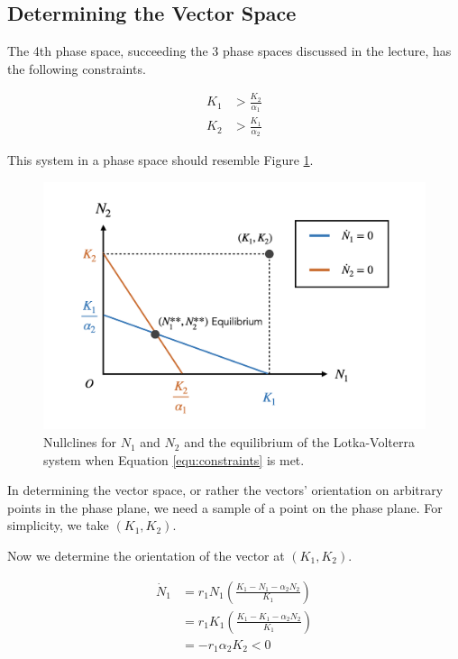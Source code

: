 \subsection{Determining the Vector Space}
The 4th phase space, succeeding the 3 phase spaces discussed in the lecture, has the following constraints.

\begin{equation}
  \label{equ:constraints}
  \begin{aligned}
    K_1 &> \frac {K_2} {\alpha_1} \\
    K_2 &> \frac {K_1} {\alpha_2}
  \end{aligned}
\end{equation}

This system in a phase space should resemble Figure \ref{fig:graph_001}.

\begin{figure}[h]
  \centering
  \includegraphics[width = \textwidth]{fig/graph_001.png}
  \caption {Nullclines for $N_1$ and $N_2$ and the equilibrium of the Lotka-Volterra system when Equation \ref{equ:constraints} is met.}
  \label{fig:graph_001}
\end{figure}

In determining the vector space, or rather the vectors' orientation on arbitrary points in the phase plane, we need a sample of a point on the phase plane. For simplicity, we take $(K_1, K_2)$.


Now we determine the orientation of the vector at $(K_1, K_2)$.

\begin{equation}
  \label{equ:dotn1minus}
  \begin{aligned}
    \dot N_1
    &= r_1 N_1 \left( \frac {K_1 - N_1 - \alpha_2 N_2} {K_1} \right) \\
    &= r_1 K_1 \left( \frac {K_1 - K_1 - \alpha_2 N_2} {K_1} \right) \\
    &= - r_1 \alpha_2 K_2 < 0
  \end{aligned}
\end{equation}

